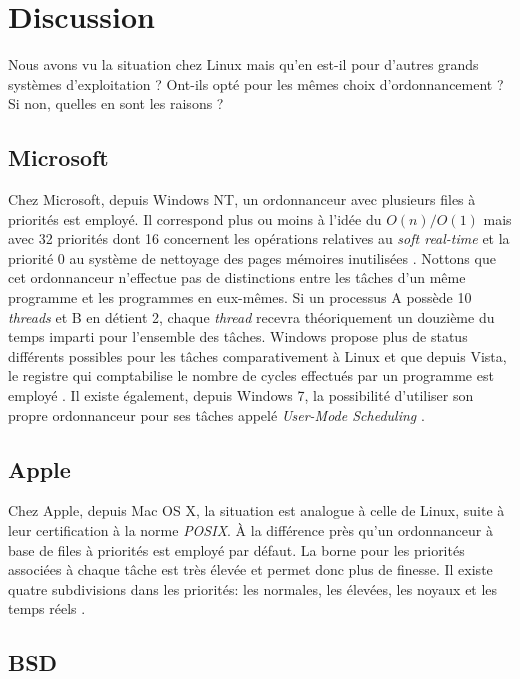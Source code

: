 \documentclass[letterpaper]{article}
\begin{document}
\section{Discussion}

Nous avons vu la situation chez Linux mais qu'en est-il pour d'autres grands systèmes d'exploitation ? Ont-ils opté pour les mêmes choix d'ordonnancement ? Si non, quelles en sont les raisons ?

\subsection{Microsoft}

Chez Microsoft, depuis Windows NT, un ordonnanceur avec plusieurs files à priorités est employé. Il correspond plus ou moins à l'idée du $O(n) / O(1)$ mais avec 32 priorités dont 16 concernent les opérations relatives au \textit{soft real-time} et la priorité 0 au système de nettoyage des pages mémoires inutilisées \citep{jones1999cpu}. Nottons que cet ordonnanceur n'effectue pas de distinctions entre les tâches d'un même programme et les programmes en eux-mêmes. Si un processus A possède 10 \textit{threads} et B en détient 2, chaque \textit{thread} recevra théoriquement un douzième du temps imparti pour l'ensemble des tâches. Windows propose plus de status différents possibles pour les tâches comparativement à Linux et que depuis Vista, le registre qui comptabilise le nombre de cycles effectués par un programme est employé \citep{Russinovich:2009:WII:1717352}. Il existe également, depuis Windows 7, la possibilité d'utiliser son propre ordonnanceur pour ses tâches appelé \textit{User-Mode Scheduling} \citep{UMS}.

\subsection{Apple}

Chez Apple, depuis Mac OS X, la situation est analogue à celle de Linux, suite à leur certification à la norme \textit{POSIX}. À la différence près qu'un ordonnanceur à base de files à priorités est employé par défaut. La borne pour les priorités associées à chaque tâche est très élevée et permet donc plus de finesse. Il existe quatre subdivisions dans les priorités: les normales, les élevées, les noyaux et les temps réels \citep{singh2006mac}.

\subsection{BSD}
\end{document}

